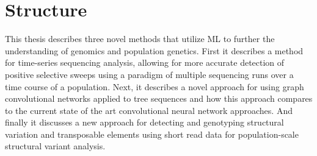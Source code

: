 \section{Structure}

This thesis describes three novel methods that utilize ML to further the understanding of genomics and population genetics. First  it describes a method for time-series sequencing analysis, allowing for more accurate detection of positive selective sweeps using a paradigm of multiple sequencing runs over a time course of a population. Next, it describes a novel approach for using graph convolutional networks applied to tree sequences and how this approach compares to the current state of the art convolutional neural network approaches. And finally it discusses a new approach for detecting and genotyping structural variation and transposable elements using short read data for population-scale structural variant analysis.
